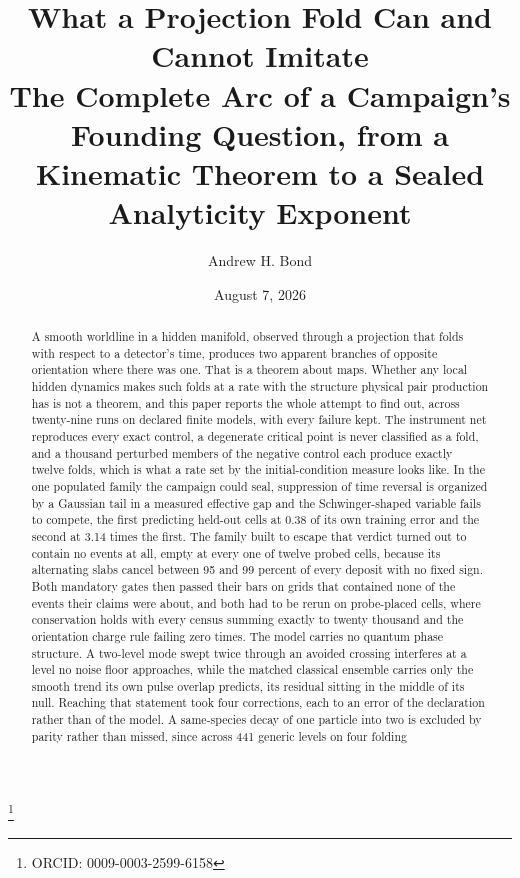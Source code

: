\documentclass[aps,pre,reprint,nofootinbib,floatfix]{revtex4-2}
\begin{document}
\title{What a Projection Fold Can and Cannot Imitate\\
The Complete Arc of a Campaign's Founding Question, from a Kinematic
Theorem to a Sealed Analyticity Exponent}

\author{Andrew H. Bond}
\thanks{ORCID: 0009-0003-2599-6158}
\date{August 7, 2026}

\begin{abstract}
A smooth worldline in a hidden manifold, observed through a projection
that folds with respect to a detector's time, produces two apparent
branches of opposite orientation where there was one.  That is a
theorem about maps.  Whether any local hidden dynamics makes such folds
at a rate with the structure physical pair production has is not a
theorem, and this paper reports the whole attempt to find out, across
twenty-nine runs on declared finite models, with every failure kept.  The
instrument net reproduces every exact control, a
degenerate critical point is never classified as a fold, and a thousand
perturbed members of the negative control each produce exactly twelve
folds, which is what a rate set by the initial-condition measure looks
like.  In the one populated family the campaign could seal, suppression
of time reversal is organized by a Gaussian tail in a measured
effective gap and the Schwinger-shaped variable fails to compete, the
first predicting held-out cells at 0.38 of its own training error and
the second at 3.14 times the first.  The family built to escape that
verdict turned out to contain no events at all, empty at every one of
twelve probed cells, because its alternating slabs cancel between 95
and 99 percent of every deposit with no fixed sign.  Both mandatory
gates then passed their bars on grids that contained none of the events
their claims were about, and both had to be rerun on probe-placed
cells, where conservation holds with every census summing exactly to
twenty thousand and the orientation charge rule failing zero times.
The model carries no quantum phase structure.  A two-level mode swept
twice through an avoided crossing interferes at a level no noise floor
approaches, while the matched classical ensemble carries only the
smooth trend its own pulse overlap predicts, its residual sitting in
the middle of its null.  Reaching that statement took four corrections,
each to an error of the declaration rather than of the model.  A
same-species decay of one particle into two is excluded by parity
rather than missed, since across 441 generic levels on four folding

\end{abstract}
\end{document}
